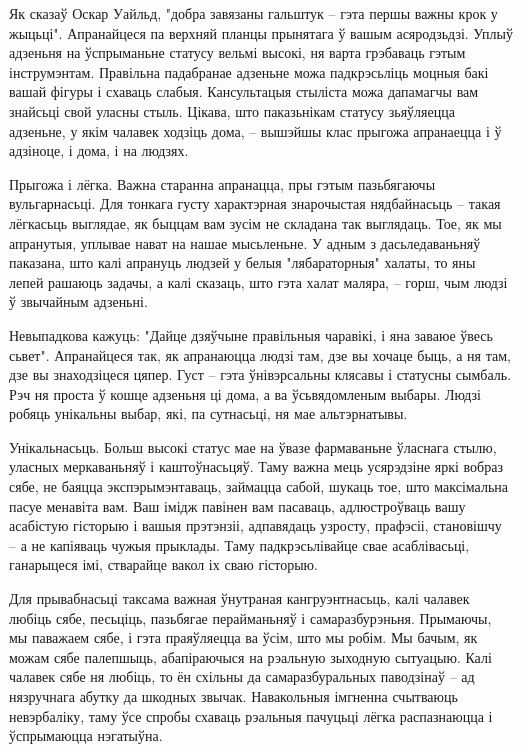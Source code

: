 Як сказаў Оскар Уайльд, "добра завязаны гальштук – гэта першы важны крок у жыцьці". Апранайцеся па верхняй планцы прынятага ў вашым асяродзьдзі. Уплыў адзеньня на ўспрыманьне статусу вельмі высокі, ня варта грэбаваць гэтым інструмэнтам. Правільна падабранае адзеньне можа падкрэсьліць моцныя бакі вашай фігуры і схаваць слабыя. Кансультацыя стыліста можа дапамагчы вам знайсьці свой уласны стыль. Цікава, што паказьнікам статусу зьяўляецца адзеньне, у якім чалавек ходзіць дома, – вышэйшы клас прыгожа апранаецца і ў адзіноце, і дома, і на людзях.

Прыгожа і лёгка. Важна старанна апранацца, пры гэтым пазьбягаючы вульгарнасьці. Для тонкага густу характэрная знарочыстая нядбайнасьць – такая лёгкасьць выглядае, як быццам вам зусім не складана так выглядаць. Тое, як мы апранутыя, уплывае нават на нашае мысьленьне. У адным з дасьледаваньняў паказана, што калі апрануць людзей у белыя "лябараторныя" халаты, то яны лепей рашаюць задачы, а калі сказаць, што гэта халат маляра, – горш, чым людзі ў звычайным адзеньні.

Невыпадкова кажуць: "Дайце дзяўчыне правільныя чаравікі, і яна заваюе ўвесь сьвет". Апранайцеся так, як апранаюцца людзі там, дзе вы хочаце быць, а ня там, дзе вы знаходзіцеся цяпер. Густ – гэта ўнівэрсальны клясавы і статусны сымбаль. Рэч ня проста ў кошце адзеньня ці дома, а ва ўсьвядомленым выбары. Людзі робяць унікальны выбар, які, па сутнасьці, ня мае альтэрнатывы.

Унікальнасьць. Больш высокі статус мае на ўвазе фармаваньне ўласнага стылю, уласных меркаваньняў і каштоўнасьцяў. Таму важна мець усярэдзіне яркі вобраз сябе, не баяцца экспэрымэнтаваць, займацца сабой, шукаць тое, што максімальна пасуе менавіта вам. Ваш імідж павінен вам пасаваць, адлюстроўваць вашу асабістую гісторыю і вашыя прэтэнзіі, адпавядаць узросту, прафэсіі, становішчу – а не капіяваць чужыя прыклады. Таму падкрэсьлівайце свае асаблівасьці, ганарыцеся імі, стварайце вакол іх сваю гісторыю.

Для прывабнасьці таксама важная ўнутраная кангруэнтнасьць, калі чалавек любіць сябе, песьціць, пазьбягае перайманьняў і самаразбурэньня. Прымаючы, мы паважаем сябе, і гэта праяўляецца ва ўсім, што мы робім. Мы бачым, як можам сябе палепшыць, абапіраючыся на рэальную зыходную сытуацыю. Калі чалавек сябе ня любіць, то ён схільны да самаразбуральных паводзінаў – ад нязручнага абутку да шкодных звычак. Навакольныя імгненна счытваюць невэрбаліку, таму ўсе спробы схаваць рэальныя пачуцьці лёгка распазнаюцца і ўспрымаюцца нэгатыўна.

